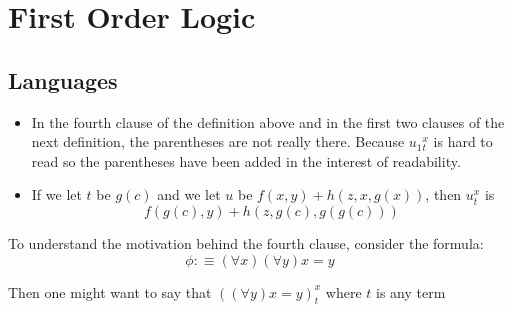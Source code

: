 \chapter{First Order Logic}

\section{Languages}





















\begin{itemize}
    \item  In the fourth clause of the definition above and in the first two clauses of the next definition, the parentheses are not really there. Because $u_{1}{ }_{t}^{x}$ is hard to read so the parentheses have been added in the interest of readability.
    \item If we let $t$ be $g(c)$ and we let $u$ be $f(x, y)+h(z, x, g(x))$, then $u_{t}^{x}$ is
        \[
        f(g(c), y)+h(z, g(c), g(g(c)))
        \]
\end{itemize}




To understand the motivation behind the fourth clause, consider the formula:
\[
\phi :\equiv \left( \forall x \right) \left( \forall y \right) x = y
\]

Then one might want to say that $ \left( \left( \forall y \right) x = y \right) _{ t }^{ x }   $  where $ t $ is any term



